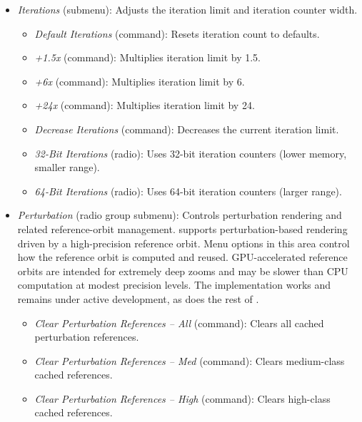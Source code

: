 \begin{itemize}
\begin{itemize}
    \end{itemize}

  \item \emph{Iterations} (submenu): Adjusts the iteration limit and iteration counter width.
    \begin{itemize}
      \item \emph{Default Iterations} (command): Resets iteration count to defaults.
      \item \emph{+1.5x} (command): Multiplies iteration limit by 1.5.
      \item \emph{+6x} (command): Multiplies iteration limit by 6.
      \item \emph{+24x} (command): Multiplies iteration limit by 24.
      \item \emph{Decrease Iterations} (command): Decreases the current iteration limit.
      \item \emph{32-Bit Iterations} (radio): Uses 32-bit iteration counters (lower memory, smaller range).
      \item \emph{64-Bit Iterations} (radio): Uses 64-bit iteration counters (larger range).
    \end{itemize}

  \item \emph{Perturbation} (radio group submenu): Controls perturbation
    rendering and related reference-orbit management.  \FractalShark{} supports
    perturbation-based rendering driven by a high-precision reference orbit.
    Menu options in this area control how the reference orbit is computed and
    reused.  GPU-accelerated reference orbits are intended for extremely deep
    zooms and may be slower than CPU computation at modest precision levels.
    The implementation works and remains under active development, as does
    the rest of \FractalShark{}.
    \begin{itemize}
      \item \emph{Clear Perturbation References -- All} (command): Clears all cached perturbation references.
      \item \emph{Clear Perturbation References -- Med} (command): Clears medium-class cached references.
      \item \emph{Clear Perturbation References -- High} (command): Clears high-class cached references.


\end{itemize}
\end{itemize}

